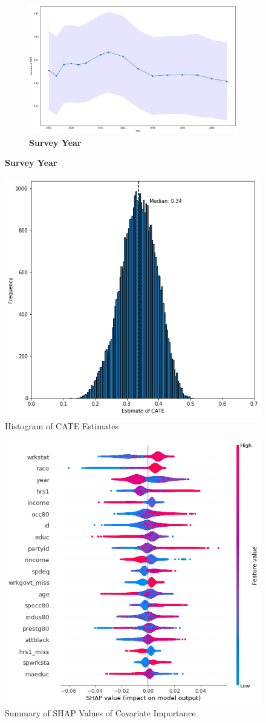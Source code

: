 \documentclass[12pt]{article}
\begin{document}
\begin{figure}[h]
{\begin{subfigure} [h] {0.45\linewidth}
	\end{subfigure}
	\begin{subfigure} [h] {0.45\linewidth}
		\caption{\textbf{Survey Year}}
   	 	\includegraphics[width = \linewidth]{Graphs/s1_year.png}
	\end{subfigure}}
\end{figure} 

\begin{figure}[h]
\caption{Histogram of CATE Estimates}
	\centering
   	 	\includegraphics[width = 0.6\linewidth]{Graphs/s1_catefreq.png}
\end{figure} 

\begin{figure}[h]
\caption{Summary of SHAP Values of Covariate Importance}
	\centering
   	 	\includegraphics[width = 0.6\linewidth]{Graphs/s1_shap.png}
\end{figure} 
\end{document}
